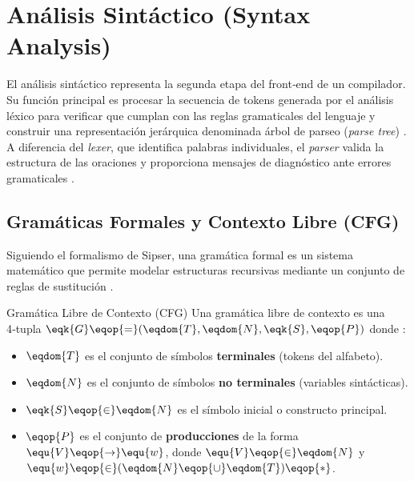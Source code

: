 
\chapter{Análisis Sintáctico (Syntax Analysis)}
\label{ch:syntax}

El análisis sintáctico representa la segunda etapa del front‑end de un compilador. Su función principal es procesar la secuencia de tokens generada por el análisis léxico para verificar que cumplan con las reglas gramaticales del lenguaje y construir una representación jerárquica denominada árbol de parseo (\textit{parse tree}) \cite{aho2006compilers}. A diferencia del \textit{lexer}, que identifica palabras individuales, el \textit{parser} valida la estructura de las oraciones y proporciona mensajes de diagnóstico ante errores gramaticales \cite{aho2006compilers}.

\section{Gramáticas Formales y Contexto Libre (CFG)}
\label{sec:3_1_cfg}

Siguiendo el formalismo de Sipser, una gramática formal es un sistema matemático que permite modelar estructuras recursivas mediante un conjunto de reglas de sustitución \cite{sipser2012introduction}.

\begin{definicion}{Gramática Libre de Contexto (CFG)}
Una gramática libre de contexto es una 4‑tupla $\eqk{G} \eqop{=} (\eqdom{T}, \eqdom{N}, \eqk{S}, \eqop{P})$ donde \cite{sipser2012introduction, aho2006compilers}:
\begin{itemize}
    \item $\eqdom{T}$ es el conjunto de símbolos \textbf{terminales} (tokens del alfabeto).
    \item $\eqdom{N}$ es el conjunto de símbolos \textbf{no terminales} (variables sintácticas).
    \item $\eqk{S} \eqop{\in} \eqdom{N}$ es el símbolo inicial o constructo principal.
    \item $\eqop{P}$ es el conjunto de \textbf{producciones} de la forma $\equ{V} \eqop{\rightarrow} \equ{w}$, donde $\equ{V} \eqop{\in} \eqdom{N}$ y $\equ{w} \eqop{\in} (\eqdom{N} \eqop{\cup} \eqdom{T})\eqop{*}$.
\end{itemize}
\end{definicion}

